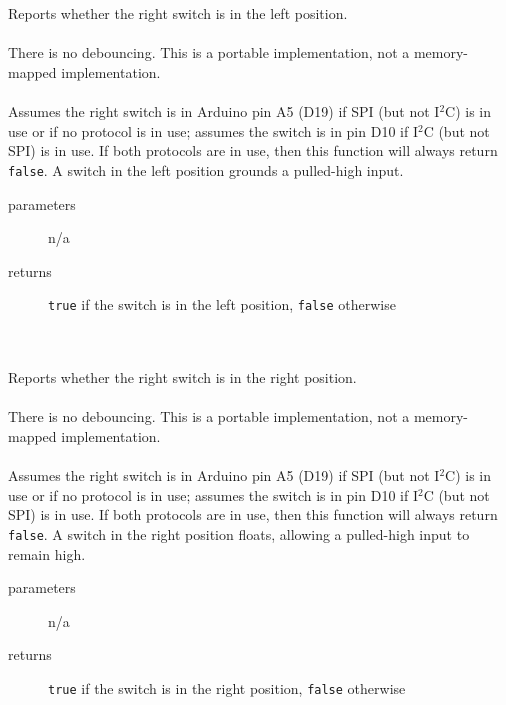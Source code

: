 \begin{itemize}
         \\ \\
        Reports whether the right switch is in the left position. \\ \\
        There is no debouncing.
        This is a portable implementation, not a memory-mapped implementation. \\ \\
        Assumes the right switch is in Arduino pin A5 (D19) if SPI (but not I$^2$C) is in use or if no protocol is in use;
        assumes the switch is in pin D10 if I$^2$C (but not SPI) is in use.
        If both protocols are in use, then this function will always return \lstinline{false}.
        A switch in the left position grounds a pulled-high input.
        \begin{description}
            \item[parameters] n/a
            \item[returns] \lstinline{true} if the switch is in the left position, \lstinline{false} otherwise
        \end{description}

         \\ \\
        Reports whether the right switch is in the right position. \\ \\
        There is no debouncing.
        This is a portable implementation, not a memory-mapped implementation. \\ \\
        Assumes the right switch is in Arduino pin A5 (D19) if SPI (but not I$^2$C) is in use or if no protocol is in use;
        assumes the switch is in pin D10 if I$^2$C (but not SPI) is in use.
        If both protocols are in use, then this function will always return \lstinline{false}.
        A switch in the right position floats, allowing a pulled-high input to remain high.
        \begin{description}
            \item[parameters] n/a
            \item[returns] \lstinline{true} if the switch is in the right position, \lstinline{false} otherwise
        \end{description}

    \end{itemize}


